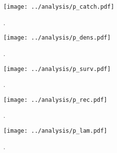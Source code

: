 \documentclass[11pt]{article}
\begin{document}

\clearpage



\clearpage
\begin{figure}
\centering
\texttt{[image: ../analysis/p\_catch.pdf]}
\caption{\label{fig:p_catch}
.
}
\end{figure}
\clearpage

\clearpage
\begin{figure}
\centering
\texttt{[image: ../analysis/p\_dens.pdf]}
\caption{\label{fig:p_dens}
.
}
\end{figure}
\clearpage

\clearpage
\begin{figure}
\centering
\texttt{[image: ../analysis/p\_surv.pdf]}
\caption{\label{fig:p_surv}
.
}
\end{figure}
\clearpage

\clearpage
\begin{figure}
\centering
\texttt{[image: ../analysis/p\_rec.pdf]}
\caption{\label{fig:p_rec}
.
}
\end{figure}
\clearpage

\clearpage
\begin{figure}
\centering
\texttt{[image: ../analysis/p\_lam.pdf]}
\caption{\label{fig:p_lam}
.
}
\end{figure}
\clearpage
\end{document}
